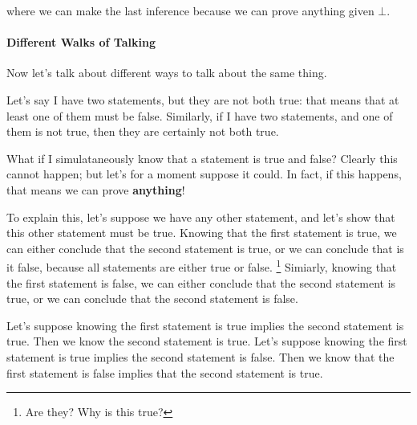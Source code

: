 \begin{mathpar}
\end{mathpar}

where we can make the last inference because we can prove anything given $\bot$.

\paragraph{Different Walks of Talking}
Now let's talk about different ways to talk about the same thing.

Let's say I have two statements, but they are not both true: that means that at least one of them must be false.
Similarly, if I have two statements, and one of them is not true, then they are certainly not both true.

What if I simulataneously know that a statement is true and false?
Clearly this cannot happen; but let's for a moment suppose it could.
In fact, if this happens, that means we can prove \textbf{anything}!

To explain this, let's suppose we have any other statement, and let's show that this other statement must be true.
Knowing that the first statement is true, we can either conclude that the second statement is true, or we can conclude that is it false, because all statements are either true or false. \footnote{Are they? Why is this true?}
Simiarly, knowing that the first statement is false, we can either conclude that the second statement is true, or we can conclude that the second statement is false.

Let's suppose knowing the first statement is true implies the second statement is true.
Then we know the second statement is true.
Let's suppose knowing the first statement is true implies the second statement is false.
Then we know that the first statement is false implies that the second statement is true.


